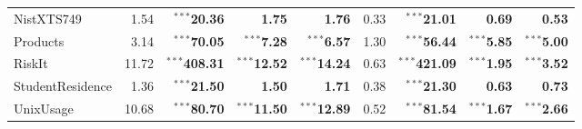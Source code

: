 \documentclass{article}
\newcommand{\schemaForTable}[1]{#1\xspace}
\newcommand{\NistXTSNineForTable}{\schemaForTable{NistXTS749}}
\newcommand{\ProductsForTable}{\schemaForTable{Products}}
\newcommand{\RiskItForTable}{\schemaForTable{RiskIt}}
\newcommand{\StudentResidenceForTable}{\schemaForTable{StudentResidence}}
\newcommand{\UnixUsageForTable}{\schemaForTable{UnixUsage}}
\begin{document}
\begin{table}[!ht]
\begin{center}
{\begin{tabular}{lrrrr|rrrr}
\NistXTSNineForTable&1.54&$^{\ast\ast\ast}$\textbf{20.36}&\textbf{1.75}&\textbf{1.76}&0.33&$^{\ast\ast\ast}$\textbf{21.01}&\textbf{0.69}&\textbf{0.53}\\
\ProductsForTable&3.14&$^{\ast\ast\ast}$\textbf{70.05}&$^{\ast\ast\ast}$\textbf{7.28}&$^{\ast\ast\ast}$\textbf{6.57}&1.30&$^{\ast\ast\ast}$\textbf{56.44}&$^{\ast\ast\ast}$\textbf{5.85}&$^{\ast\ast\ast}$\textbf{5.00}\\
\RiskItForTable&11.72&$^{\ast\ast\ast}$\textbf{408.31}&$^{\ast\ast\ast}$\textbf{12.52}&$^{\ast\ast\ast}$\textbf{14.24}&0.63&$^{\ast\ast\ast}$\textbf{421.09}&$^{\ast\ast\ast}$\textbf{1.95}&$^{\ast\ast\ast}$\textbf{3.52}\\
\StudentResidenceForTable&1.36&$^{\ast\ast\ast}$\textbf{21.50}&\textbf{1.50}&\textbf{1.71}&0.38&$^{\ast\ast\ast}$\textbf{21.30}&\textbf{0.63}&\textbf{0.73}\\
\UnixUsageForTable&10.68&$^{\ast\ast\ast}$\textbf{80.70}&$^{\ast\ast\ast}$\textbf{11.50}&$^{\ast\ast\ast}$\textbf{12.89}&0.52&$^{\ast\ast\ast}$\textbf{81.54}&$^{\ast\ast\ast}$\textbf{1.67}&$^{\ast\ast\ast}$\textbf{2.66}\\      \hline
      \end{tabular}
    }
  \end{center}
\end{table}
\end{document}
